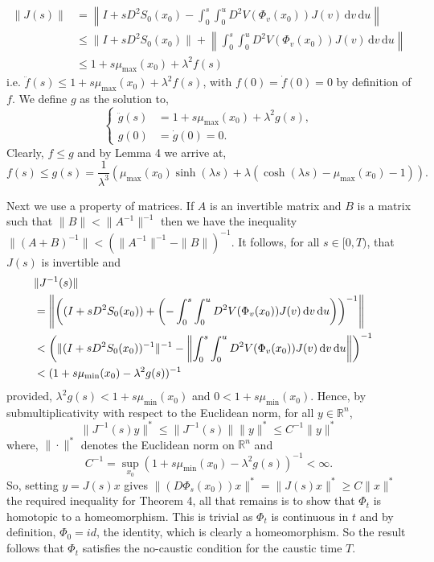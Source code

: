 \documentclass[a4paper,12pt,draft]{report}
\begin{document}
{\begin{align}
\|J(s)\| & = \left\|I + sD^2S_0(x_0) - \int_0^s\int_0^u D^2V(\Phi_v(x_0))J(v)\,\mathrm{d}v\,\mathrm{d}u\right\|\nonumber\\
& \le \|I + sD^2S_0(x_0)\| + \left\|\int_0^s\int_0^u D^2V(\Phi_v(x_0))J(v)\,\mathrm{d}v\,\mathrm{d}u\right\| \nonumber\\
& \le 1 + s\mu_{\mathrm{max}}(x_0) + \lambda^2f(s)\nonumber
\end{align}
i.e. $\ddot{f}(s) \le 1 + s\mu_{\mathrm{max}}(x_0) + \lambda^2f(s)$, with $f(0) = \dot{f}(0) = 0$ by definition of $f$.  We define $g$ as the solution to,
$$
\left\{
\begin{aligned}
\ddot{g}(s) & = 1 + s\mu_{\mathrm{max}}(x_0) + \lambda^2g(s),\\
g(0) & = \dot{g}(0) = 0.
\end{aligned}
\right.
$$
Clearly, $f \le g$ and by Lemma 4 we arrive at,
$$
f(s) \le g(s) = \frac{1}{\lambda^3}(\mu_{\mathrm{max}}(x_0)\sinh(\lambda s) + \lambda(\cosh(\lambda s) - \mu_{\mathrm{max}}(x_0) - 1)).
$$

Next we use a property of matrices.  If $A$ is an invertible matrix and $B$ is a matrix such that $\|B\| < \|A^{-1}\|^{-1}$ then we have the inequality $\|(A + B)^{-1}\| < (\|A^{-1}\|^{-1} - \|B\|)^{-1}$.
It follows, for all $s \in [0, T)$, that $J(s)$ is invertible and
\begin{align}
\lefteqn{\|J^{-1}(s)\|}\nonumber\\
& = \left\|\left((I + sD^2S_0(x_0)) + \left(-\int_0^s\int_0^u D^2V(\Phi_v(x_0))J(v)\,\mathrm{d}v\,\mathrm{d}u\right)\right)^{-1}\right\|\nonumber\\
& < \left(\|(I + sD^2S_0(x_0))^{-1}\|^{-1} - \left\|\int_0^s\int_0^u D^2V(\Phi_v(x_0))J(v)\,\mathrm{d}v\,\mathrm{d}u\right\|\right)^{-1}\nonumber\\
& < (1 + s\mu_{\mathrm{min}}(x_0) - \lambda^2g(s))^{-1}\nonumber
\end{align}
provided, $\lambda^2g(s) < 1 + s\mu_{\mathrm{min}}(x_0)$ and $0 < 1 + s\mu_{\mathrm{min}}(x_0)$.  Hence, by submultiplicativity with respect to the Euclidean norm, for all $y \in \mathbb{R}^n$,
$$
\|J^{-1}(s)y\|^* \le \|J^{-1}(s)\|\|y\|^* \le C^{-1}\|y\|^*
$$
where, $\|\cdot\|^*$ denotes the Euclidean norm on $\mathbb{R}^n$ and 
$$
C^{-1} = \sup_{x_0}(1 + s\mu_{\mathrm{min}}(x_0) - \lambda^2g(s))^{-1} < \infty.
$$
So, setting $y = J(s)x$ gives $\|(D\Phi_s(x_0))x\|^* = \|J(s)x\|^* \ge C\|x\|^*$ the required inequality for Theorem 4, all that remains is to show that $\Phi_t$ is homotopic to a homeomorphism.  This is trivial as $\Phi_t$ is continuous in $t$ and by definition, $\Phi_0 = id$, the identity, which is clearly a homeomorphism.  So the result follows that $\Phi_t$ satisfies the no-caustic condition for the caustic time $T$.

\qedhere
}
\end{document}
